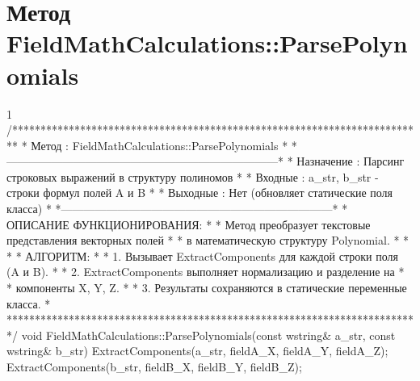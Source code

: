 \section{Метод FieldMathCalculations::ParsePolynomials}
\footnotesize
\begin{listing}{1}
/*************************************************************************
* Метод         : FieldMathCalculations::ParsePolynomials                *
*------------------------------------------------------------------------*
* Назначение    : Парсинг строковых выражений в структуру полиномов      *
* Входные       : a_str, b_str - строки формул полей A и B               *
* Выходные      : Нет (обновляет статические поля класса)                *
*------------------------------------------------------------------------*
* ОПИСАНИЕ ФУНКЦИОНИРОВАНИЯ:                                             *
* Метод преобразует текстовые представления векторных полей              *
* в математическую структуру Polynomial.                                   *
* *
* АЛГОРИТМ:                                                              *
* 1. Вызывает ExtractComponents для каждой строки поля (A и B).          *
* 2. ExtractComponents выполняет нормализацию и разделение на            *
* компоненты X, Y, Z.                                                    *
* 3. Результаты сохраняются в статические переменные класса.             *
*************************************************************************/
void FieldMathCalculations::ParsePolynomials(const wstring& a_str, 
                                             const wstring& b_str) {
    ExtractComponents(a_str, fieldA_X, fieldA_Y, fieldA_Z);
    ExtractComponents(b_str, fieldB_X, fieldB_Y, fieldB_Z);
}
\end{listing}
\normalsize

\pagebreak

